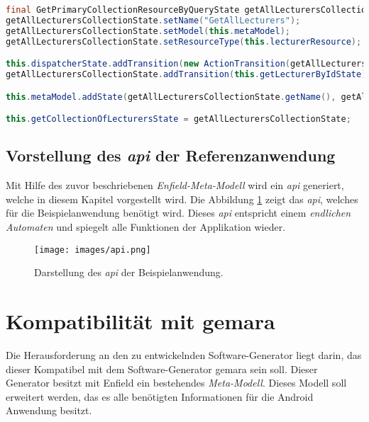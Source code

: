 \begin{lstlisting}[label=lst:getState_impl,
language=java,
firstnumber=1,
caption=Erzeugung des \textit{GetAllLecturers States}. ]
final GetPrimaryCollectionResourceByQueryState getAllLecturersCollectionState = new GetPrimaryCollectionResourceByQueryState();
getAllLecturersCollectionState.setName("GetAllLecturers");
getAllLecturersCollectionState.setModel(this.metaModel);
getAllLecturersCollectionState.setResourceType(this.lecturerResource);

this.dispatcherState.addTransition(new ActionTransition(getAllLecturersCollectionState, "getAllLecturers"));
getAllLecturersCollectionState.addTransition(this.getLecturerByIdState);

this.metaModel.addState(getAllLecturersCollectionState.getName(), getAllLecturersCollectionState);

this.getCollectionOfLecturersState = getAllLecturersCollectionState;
\end{lstlisting}
 
\subsection{Vorstellung des \textit{\ac{api}} der Referenzanwendung}
Mit Hilfe des zuvor beschriebenen \textit{Enfield-Meta-Modell} wird ein \textit{\acf{api}} generiert, welche in diesem Kapitel vorgestellt wird.
Die Abbildung \ref{fig:api} zeigt das \textit{\acf{api}}, welches für die Beispielanwendung benötigt wird. Dieses\textit{ \ac{api}} entspricht einem \textit{endlichen Automaten} und spiegelt alle Funktionen der Applikation wieder.  

\begin{figure}[H]
	\begin{center}
		\texttt{[image: images/api.png]}
		\caption{Darstellung des \textit{\ac{api}} der Beispielanwendung.}
		\label{fig:api}
	\end{center}
\end{figure}

\section{Kompatibilität mit \ac{gemara}}
Die Herausforderung an den zu entwickelnden Software-Generator liegt darin, das dieser Kompatibel mit dem Software-Generator \acf{gemara} sein soll. Dieser Generator besitzt mit Enfield ein bestehendes \textit{Meta-Modell}. Dieses Modell soll erweitert werden, das es alle benötigten Informationen für die Android Anwendung besitzt. 
 
